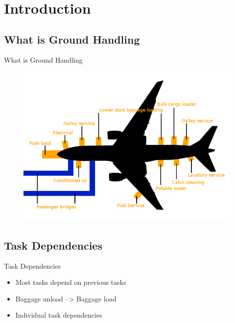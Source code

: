\section{Introduction}

\subsection{What is Ground Handling}
\begin{frame}{What is Ground Handling}
\begin{figure}
    \centering
    \includegraphics[width=\textwidth]{Grafik/Apron}
\end{figure}
\end{frame}

\subsection{Task Dependencies}
\begin{frame}{Task Dependencies}
\begin{itemize}
	\item Most tasks depend on previous tasks
	\item Baggage unload --> Baggage load
	\item Individual task dependencies
\end{itemize}
\end{frame}

